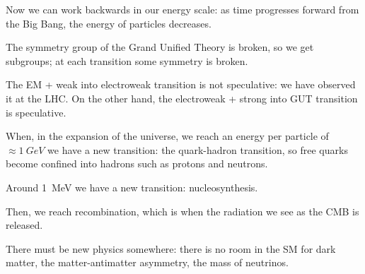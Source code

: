 \documentclass[main.tex]{subfiles}
\begin{document}
Now we can work backwards in our energy scale: as time progresses forward from the Big Bang, the energy of particles decreases. 

The symmetry group of the Grand Unified Theory is broken, so we get subgroups; at each transition some symmetry is broken. 

The EM + weak into electroweak transition is not speculative: we have observed it at the LHC. 
On the other hand, the electroweak + strong into GUT transition is speculative. 

When, in the expansion of the universe, we reach an energy per particle of \(\approx \SI{1}{GeV}\) we have a new transition: the quark-hadron transition, so free quarks become confined into hadrons such as protons and neutrons. 

Around \SI{1}{MeV} we have a new transition: nucleosynthesis. 

Then, we reach recombination, which is when the radiation we see as the CMB is released.

There must be new physics somewhere: there is no room in the SM for dark matter, the matter-antimatter asymmetry, the mass of neutrinos. 
\end{document}
